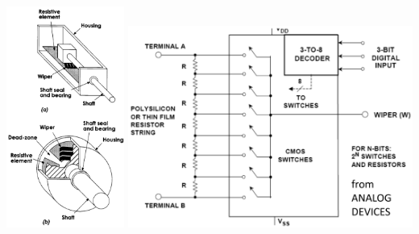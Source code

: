 \documentclass[11pt]{article}
\begin{document}
\begin{center}
\includegraphics[width=0.29\textwidth]{./images/potentiometer-diagrams.png}
\includegraphics[width=0.7\textwidth]{./images/potentiometer-use-in-circuits.png}
\end{center}

 \newpage
\end{document}
